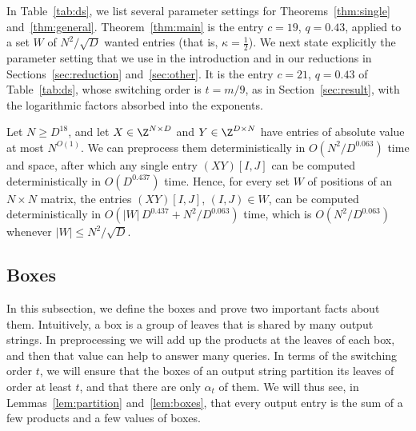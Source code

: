 In Table~\ref{tab:ds}, we list several parameter settings for Theorems~\ref{thm:single} and~\ref{thm:general}. Theorem~\ref{thm:main} is the entry $c=19$, $q=0.43$, applied to a set $W$ of $N^2/\sqrt D$ wanted entries (that is, $\kappa=\frac12$). 
We next state explicitly the parameter setting that we use in the introduction and in our reductions in Sections~\ref{sec:reduction} and~\ref{sec:other}. It is the entry $c=21$, $q=0.43$ of Table~\ref{tab:ds}, whose switching order is $t=m/9$, as in Section~\ref{sec:result}, with the logarithmic factors absorbed into the exponents. 

\begin{corollary}\label{cor:zt}
Let $N\ge D^{18}$, and let $X\in\Z^{N\times D}$ and $Y\in\Z^{D\times N}$ have entries of absolute value at most $N^{O(1)}$. We can preprocess them deterministically in $O(N^2/D^{0.063})$ time and space, after which any single entry $(XY)[I,J]$ can be computed deterministically in $O(D^{0.437})$ time. Hence, for every set $W$ of positions of an $N\times N$ matrix, the entries $(XY)[I,J]$, $(I,J)\in W$, can be computed deterministically in $O(|W|\,D^{0.437}+N^2/D^{0.063})$ time, which is $O(N^2/D^{0.063})$ whenever $|W|\le N^2/\sqrt D$.
\end{corollary}


\subsection{Boxes}\label{sec:boxes}

In this subsection, we define the boxes and prove  two important facts about them. Intuitively, a box is a group of leaves that is shared by many output strings. In preprocessing we will add up the products at the leaves of each box, and then that value can help to answer many queries. In terms of the switching order $t$, we will ensure that the boxes of an output string partition its leaves of order at least $t$, and that there are only $\alpha_t$ of them. We will thus see, in Lemmas~\ref{lem:partition} and~\ref{lem:boxes}, that every output entry is the sum of a few products and a few values of boxes.

